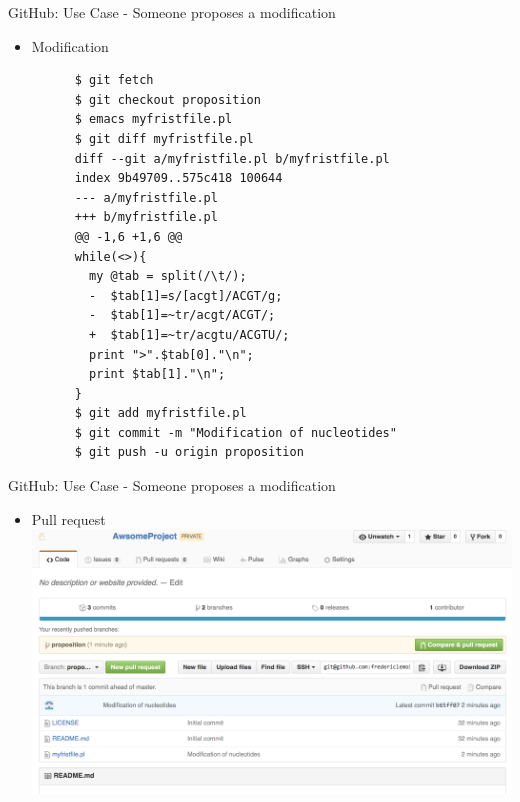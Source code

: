 \begin{frame}[fragile]{GitHub: Use Case - Someone proposes a modification}
  \begin{itemize}
  \item Modification
    \begin{lstlisting}
      $ git fetch
      $ git checkout proposition
      $ emacs myfristfile.pl
      $ git diff myfristfile.pl
      diff --git a/myfristfile.pl b/myfristfile.pl
      index 9b49709..575c418 100644
      --- a/myfristfile.pl
      +++ b/myfristfile.pl
      @@ -1,6 +1,6 @@
      while(<>){
        my @tab = split(/\t/);
        -  $tab[1]=s/[acgt]/ACGT/g;
        -  $tab[1]=~tr/acgt/ACGT/;
        +  $tab[1]=~tr/acgtu/ACGTU/;
        print ">".$tab[0]."\n";
        print $tab[1]."\n";
      }
      $ git add myfristfile.pl
      $ git commit -m "Modification of nucleotides"
      $ git push -u origin proposition
    \end{lstlisting}
  \end{itemize}
\end{frame}

\begin{frame}[fragile]{GitHub: Use Case - Someone proposes a modification}
  \begin{itemize}
  \item Pull request
    \includegraphics[width=\textwidth]{images/hosting_services_use_case_5.png}
  \end{itemize}
\end{frame}

